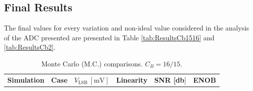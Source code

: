 \subsection{Final Results}

The final values for every variation and non-ideal value considered in the analysis of the ADC presented are presented in Table \ref{tab:ResultsCb1516} and \ref{tab:ResultsCb2}.

\begin{table}[H]
    \centering
    \caption{Monte Carlo (M.C.) comparisons. $C_B = 16/15$.}
    \begin{tabularx}{\textwidth}{
      >{\centering\arraybackslash}X 
      >{\centering\arraybackslash}X 
      >{\centering\arraybackslash}X 
      >{\centering\arraybackslash}X 
      >{\centering\arraybackslash}X
      >{\centering\arraybackslash}X
    }
    \toprule
    \textbf{Simulation} & \textbf{Case} & \textbf{$V_{\text{LSB}}~[\si{\milli\volt}]$} & \textbf{Linearity} & \textbf{SNR [\si{\decibel}}] & \textbf{ENOB} \\


\end{tabularx}
\end{table}
